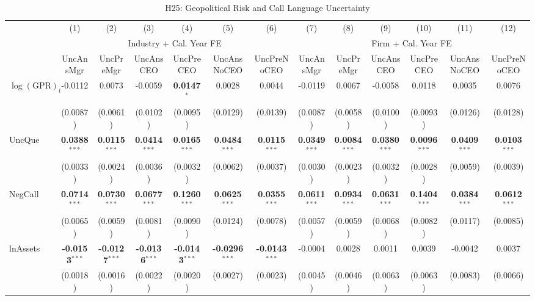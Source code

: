\documentclass[11pt,a4paper]{article}
\begin{document}
\begin{table}[htbp]
\centering
\caption{H25: Geopolitical Risk and Call Language Uncertainty}
\label{tab:h25_gpr}
\scriptsize
\begin{tabular}{lcccccccccccc}
\toprule
 & (1) & (2) & (3) & (4) & (5) & (6) & (7) & (8) & (9) & (10) & (11) & (12) \\
 & \multicolumn{6}{c}{Industry + Cal. Year FE} & \multicolumn{6}{c}{Firm + Cal. Year FE} \\
\cmidrule(lr){2-7} \cmidrule(lr){8-13}
 & UncAnsMgr & UncPreMgr & UncAnsCEO & UncPreCEO & UncAnsNoCEO & UncPreNoCEO & UncAnsMgr & UncPreMgr & UncAnsCEO & UncPreCEO & UncAnsNoCEO & UncPreNoCEO \\
\midrule
$\log(\text{GPR})_{t}$ & -0.0112 & 0.0073 & -0.0059 & \textbf{0.0147}$^{*}$ & 0.0028 & 0.0044 & -0.0119 & 0.0067 & -0.0058 & 0.0118 & 0.0035 & 0.0076 \\
 & (0.0087) & (0.0061) & (0.0102) & (0.0095) & (0.0129) & (0.0139) & (0.0087) & (0.0058) & (0.0100) & (0.0093) & (0.0126) & (0.0128) \\
\midrule
UncQue & \textbf{0.0388}$^{***}$ & \textbf{0.0115}$^{***}$ & \textbf{0.0414}$^{***}$ & \textbf{0.0165}$^{***}$ & \textbf{0.0484}$^{***}$ & \textbf{0.0115}$^{***}$ & \textbf{0.0349}$^{***}$ & \textbf{0.0084}$^{***}$ & \textbf{0.0380}$^{***}$ & \textbf{0.0096}$^{***}$ & \textbf{0.0409}$^{***}$ & \textbf{0.0103}$^{***}$ \\
 & (0.0033) & (0.0024) & (0.0036) & (0.0032) & (0.0062) & (0.0037) & (0.0030) & (0.0023) & (0.0032) & (0.0028) & (0.0059) & (0.0039) \\
NegCall & \textbf{0.0714}$^{***}$ & \textbf{0.0730}$^{***}$ & \textbf{0.0677}$^{***}$ & \textbf{0.1260}$^{***}$ & \textbf{0.0625}$^{***}$ & \textbf{0.0355}$^{***}$ & \textbf{0.0611}$^{***}$ & \textbf{0.0934}$^{***}$ & \textbf{0.0631}$^{***}$ & \textbf{0.1404}$^{***}$ & \textbf{0.0384}$^{***}$ & \textbf{0.0612}$^{***}$ \\
 & (0.0065) & (0.0059) & (0.0081) & (0.0090) & (0.0124) & (0.0078) & (0.0057) & (0.0059) & (0.0068) & (0.0082) & (0.0117) & (0.0085) \\
lnAssets & \textbf{-0.0153}$^{***}$ & \textbf{-0.0127}$^{***}$ & \textbf{-0.0136}$^{***}$ & \textbf{-0.0143}$^{***}$ & \textbf{-0.0296}$^{***}$ & \textbf{-0.0143}$^{***}$ & -0.0004 & 0.0028 & 0.0011 & 0.0039 & -0.0042 & 0.0037 \\
 & (0.0018) & (0.0016) & (0.0022) & (0.0020) & (0.0027) & (0.0023) & (0.0045) & (0.0046) & (0.0063) & (0.0063) & (0.0083) & (0.0066) \\

\end{tabular}
\end{table}
\end{document}
